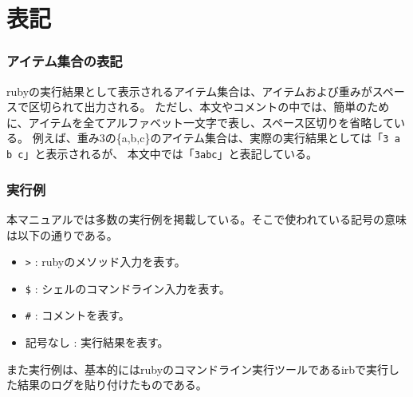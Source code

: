 \section{表記\label{sect:notation}}

\subsubsection*{アイテム集合の表記}
rubyの実行結果として表示されるアイテム集合は、アイテムおよび重みがスペースで区切られて出力される。
ただし、本文やコメントの中では、簡単のために、アイテムを全てアルファベット一文字で表し、スペース区切りを省略している。
例えば、重み3の\{a,b,c\}のアイテム集合は、実際の実行結果としては「\verb|3 a b c|」と表示されるが、
本文中では「\verb|3abc|」と表記している。

\subsubsection*{実行例}

本マニュアルでは多数の実行例を掲載している。そこで使われている記号の意味は以下の通りである。
\begin{itemize}
\item \verb|>| : rubyのメソッド入力を表す。
\item \verb|$| : シェルのコマンドライン入力を表す。
\item \verb|#| : コメントを表す。
\item 記号なし : 実行結果を表す。
\end{itemize}

また実行例は、基本的にはrubyのコマンドライン実行ツールであるirbで実行した結果のログを貼り付けたものである。

